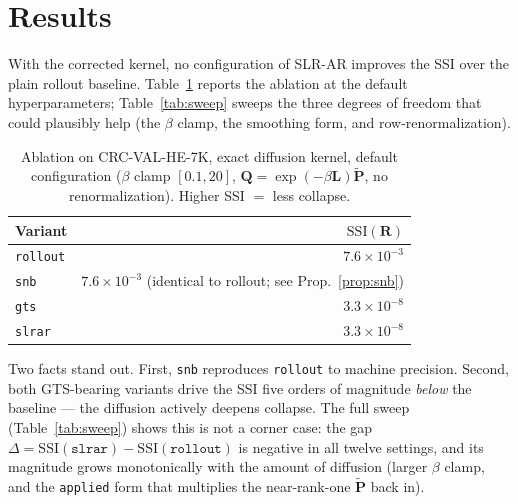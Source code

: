 \documentclass[11pt]{article}
\newcommand{\Lap}{\mathbf{L}}
\newcommand{\Pt}{\tilde{\mathbf{P}}}
\newcommand{\Q}{\mathbf{Q}}
\newcommand{\R}{\mathbf{R}}
\newcommand{\SSI}{\mathrm{SSI}}
\begin{document}
\section{Results}
\label{sec:results}

With the corrected kernel, no configuration of SLR-AR improves the SSI over the
plain rollout baseline. Table~\ref{tab:ablation} reports the ablation at the
default hyperparameters; Table~\ref{tab:sweep} sweeps the three degrees of
freedom that could plausibly help (the $\beta$ clamp, the smoothing form, and
row-renormalization).

\begin{table}[h]
\centering
\caption{Ablation on CRC-VAL-HE-7K, exact diffusion kernel, default
configuration ($\beta$ clamp $[0.1,20]$, $\Q=\exp(-\beta\Lap)\Pt$, no
renormalization). Higher SSI $=$ less collapse.}
\label{tab:ablation}
\begin{tabular}{l r}
\toprule
Variant & $\SSI(\R)$ \\
\midrule
\texttt{rollout} & $7.6\times 10^{-3}$ \\
\texttt{snb}     & $7.6\times 10^{-3}$ \quad (identical to rollout; see Prop.~\ref{prop:snb}) \\
\texttt{gts}     & $3.3\times 10^{-8}$ \\
\texttt{slrar}   & $3.3\times 10^{-8}$ \\
\bottomrule
\end{tabular}
\end{table}

Two facts stand out. First, \texttt{snb} reproduces \texttt{rollout} to machine
precision. Second, both GTS-bearing variants drive the SSI five orders of
magnitude \emph{below} the baseline --- the diffusion actively deepens collapse.
The full sweep (Table~\ref{tab:sweep}) shows this is not a corner case: the
gap $\Delta=\SSI(\texttt{slrar})-\SSI(\texttt{rollout})$ is negative in all
twelve settings, and its magnitude grows monotonically with the amount of
diffusion (larger $\beta$ clamp, and the \texttt{applied} form that multiplies
the near-rank-one $\Pt$ back in).
\end{document}
